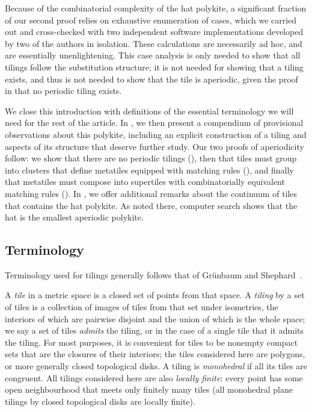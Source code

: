 Because of the combinatorial complexity of the hat polykite, 
a significant fraction of our second proof relies on exhaustive enumeration
of cases, which we carried out and cross-checked with two 
independent software implementations developed by two of the authors
in isolation.  These calculations are necessarily ad hoc, and are essentially
unenlightening.  This case
analysis is only needed to show that all tilings follow the
substitution structure; it is not needed for showing that a tiling
exists, and thus is not needed to show that the tile is aperiodic,
given the proof in  that no periodic tiling exists.

We close this introduction with definitions of the essential terminology
we will need for the rest of the article.
In ,
we then present a compendium of provisional observations about this polykite,
including an explicit construction of a tiling and aspects of its structure
that deserve further study.  Our two proofs of aperiodicity follow:
we show that there are no periodic tilings (),
then that tiles must group into clusters that define metatiles
equipped with matching rules (),
and finally that metatiles must compose into
supertiles with combinatorially equivalent matching rules
().
In , we offer additional remarks about the continuum
of tiles that contains the hat polykite.  As noted there,
computer search shows that the hat is the smallest aperiodic polykite.

\subsection{Terminology}
\label{sec:terminology}

Terminology used for tilings generally follows that of
Gr\"unbaum and Shephard~\cite{GS}.

A \emph{tile} in a metric space is a closed set of points from that
space. A \emph{tiling} by a set of tiles is a collection of images of
tiles from that set under isometries, the interiors of which are
pairwise disjoint and the union of which is the whole space; we
say a set of tiles \emph{admits} the tiling, or in the case of a single tile
that it admits the tiling.  For most purposes, it is convenient for
tiles to be nonempty compact sets that are the closures of their
interiors; the tiles considered here are polygons, or more generally
closed topological disks.  A
tiling is \emph{monohedral} if all its tiles are congruent.  All
tilings considered here are also \emph{locally finite}: every point
has some open neighbourhood that meets only finitely many tiles (all
monohedral plane tilings by closed topological disks are locally
finite).

